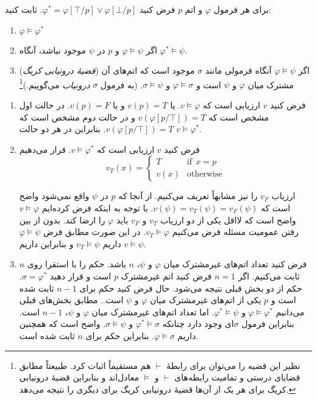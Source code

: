 برای هر فرمول $\varphi$ و اتم $p$ فرض کنید
$\varphi^*=\varphi[\top/p]\vee \varphi[\bot/p]$.
ثابت کنید:
\begin{enumerate}
\item
$\varphi\models \varphi^*$
\item
اگر
$\varphi\models \psi$
و $p$ در $\psi$ موجود نباشد، آنگاه
$\varphi^*\models \psi$.
\item
(\emph{قضیهٔ درونیابی کریگ})
اگر
$\varphi\models \psi$
آنگاه فرمولی مانند $\sigma$ موجود است که اتم‌های آن مشترک میان $\varphi$ و $\psi$ است و $\varphi\models \sigma$ و $\sigma\models \psi$.
(به فرمول $\sigma$ \emph{درونیاب} می‌گوییم.)\footnote{
  نظیر این قضیه را می‌توان برای رابطهٔ
  $\vdash$
  هم مستقیماً اثبات کرد. طبیعتاً مطابق قضایای درستی و تمامیت رابطه‌های
  $\vdash$
  و
  $\models$
  معادل‌اند و بنابراین قضیهٔ درونیابی کریگ برای هر یک از آن‌ها قضیهٔ درونیابی کریگ برای دیگری را نتیجه می‌دهد.
}

\end{enumerate}\quad\vspace{-1cm}
\begin{ans}
  \begin{enumerate}
  \item
  فرض کنید $v$ ارزیابی است که $v\models \varphi$. یا $v(p)=T$ و یا $v(p)=F$. در حالت اول مشخص است که
  $v(\varphi[p/\top])=T$
  و در حالت دوم مشخص است که
  $v(\varphi[p/\top])=T$.
  بنابراین در هر دو حالت
  $v\models \varphi^*$.

  \item
  فرض کنید $v$ ارزیابی است که $v\models \varphi^*$. قرار می‌دهیم
  $$
  v_T(x)=
  \begin{cases}
  T & \text{if}~~x=p\\
  v(x) & \text{otherwise}
  \end{cases}
  $$

  ارزیاب $v_F$ را نیز مشابهاً تعریف می‌کنیم. از آنجا که $p$ در $\psi$ واقع نمی‌شود واضح است که $v(\psi)=v_T(\psi)=v_F(\psi)$. با توجه به اینکه فرض کرده‌ایم $v\models \varphi$ واضح است که لااقل یکی از دو ارزیاب $v_T$ و $v_F$ باید $\varphi$ را ارضا کند. بدون از بین رفتن عمومیت مسئله فرض می‌کنیم $v_T\models \varphi$. در این صورت مطابق فرض $\varphi\models \psi$ داریم $v_T\models \psi$ و بنابراین داریم $v\models \psi$.

  \item
  فرض کنید تعداد اتم‌های غیرمشترک میان $\varphi$ و $\psi$، $n$ باشد. حکم را با استقرا روی $n$ ثابت می‌کنیم. اگر $n=1$ فرض کنید اتم غیرمشترک $p$ است و قرار دهید $\sigma=\varphi^*$. حکم از دو بخش قبلی نتیجه می‌شود. حال فرض کنید حکم برای $n-1$ ثابت شده است و $p$ یکی از اتم‌های غیرمشترک میان $\varphi$ و $\psi$ است.. مطابق بخش‌های قبلی می‌دانیم $\varphi\models \varphi^*$ و $\varphi^*\models \psi$. اما تعداد اتم‌های غیرمشترک میان $\varphi$ و $\psi$، $n-1$ است. بنابراین فرمول $\sigma$ای وجود دارد چنانکه $\varphi^*\models \sigma$ و $\sigma\models \psi$. واضح است که همچنین داریم $\varphi\models \sigma$. بنابراین حکم برای $n$ ثابت شده است.
  \end{enumerate}
\end{ans}
